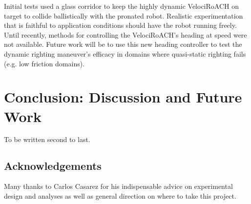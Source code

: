 \documentclass[letterpaper]{report}
\begin{document}
Initial tests used a glass corridor to keep the highly dynamic VelociRoACH on target to collide ballistically with the pronated robot.
Realistic experimentation that is faithful to application conditions should have the robot running freely.
Until recently, methods for controlling the VelociRoACH's heading at speed were not available.
Future work will be to use this new heading controller to test the dynamic righting maneuver's efficacy in domains where quasi-static righting fails (e.g. low friction domains).

\chapter{Conclusion: Discussion and Future Work}
To be written second to last.

\section{Acknowledgements}
Many thanks to Carlos Casarez for his indispensable advice on experimental design and analyses as well as general direction on where to take this project.



\end{document}

